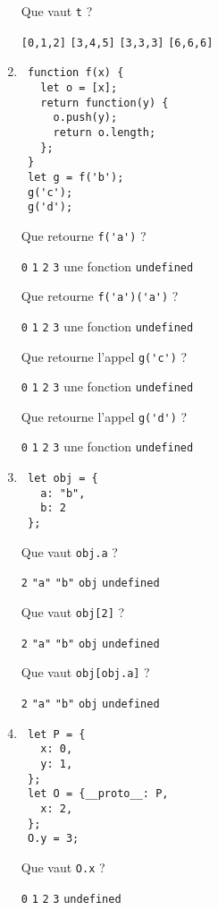 \documentclass[a4paper, 12pt]{article}
\newcommand{\choice}[1]{\Square\hspace{2pt} #1\hspace{5pt}}
\newcommand{\choicec}[1]{\Square\hspace{2pt} \lstinline{#1}\hspace{5pt}}
\begin{document}
\begin{enumerate}
  Que vaut \lstinline{t} ?

  \choicec{[0,1,2]} \choicec{[3,4,5]} \choicec{[3,3,3]} \choicec{[6,6,6]}

\item \lstset{language=javascript}
\begin{lstlisting}
 function f(x) {
   let o = [x];
   return function(y) {
     o.push(y);
     return o.length;
   };
 }
 let g = f('b');
 g('c');
 g('d');
\end{lstlisting}

  Que retourne \lstinline{f('a')} ?

  \choicec{0} \choicec{1} \choicec{2} \choicec{3} \choice{une fonction} \choicec{undefined}

  Que retourne \lstinline{f('a')('a')} ?

  \choicec{0} \choicec{1} \choicec{2} \choicec{3} \choice{une fonction} \choicec{undefined}

  Que retourne l'appel \lstinline{g('c')} ?

  \choicec{0} \choicec{1} \choicec{2} \choicec{3} \choice{une fonction} \choicec{undefined}

  Que retourne l'appel \lstinline{g('d')} ?

  \choicec{0} \choicec{1} \choicec{2} \choicec{3} \choice{une fonction} \choicec{undefined}
\item \lstset{language=javascript}
\begin{lstlisting}
 let obj = {
   a: "b",
   b: 2
 };
\end{lstlisting}

  Que vaut \lstinline{obj.a} ?

  \choicec{2} \choicec{"a"} \choicec{"b"} \choicec{obj} \choicec{undefined}

  Que vaut \lstinline{obj[2]} ?

  \choicec{2} \choicec{"a"} \choicec{"b"} \choicec{obj} \choicec{undefined}

  Que vaut \lstinline{obj[obj.a]} ?

  \choicec{2} \choicec{"a"} \choicec{"b"} \choicec{obj} \choicec{undefined}
\newpage
\item \begin{lstlisting}
 let P = {
   x: 0,
   y: 1,
 };
 let O = {__proto__: P,
   x: 2,
 };
 O.y = 3;
\end{lstlisting}

  Que vaut \lstinline{O.x} ?

  \choicec{0} \choicec{1} \choicec{2} \choicec{3} \choicec{undefined}


\end{enumerate}
\end{document}
